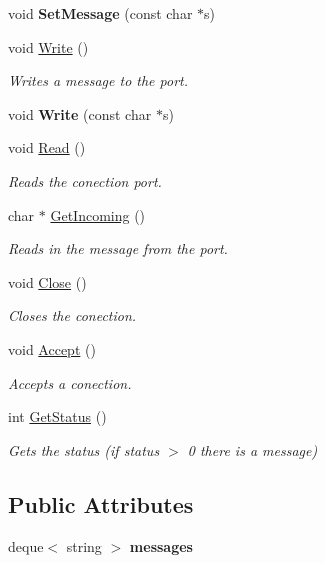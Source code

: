 \begin{DoxyCompactItemize}
\mbox{\label{class_net_thread_a488569dcffdf1056209aa8c2cd87d499}} 
void {\bfseries Set\+Message} (const char $\ast$s)
\item 
void \hyperlink{class_net_thread_a214ab68ced0017705fee382f38bf9fb7}{Write} ()
\begin{DoxyCompactList}\small\item\em Writes a message to the port. \end{DoxyCompactList}\item 
\mbox{\label{class_net_thread_aa4522291d843403e24edf38f806b4f29}} 
void {\bfseries Write} (const char $\ast$s)
\item 
void \hyperlink{class_net_thread_af3ea97a668d6e42d4ab7b81e6d126414}{Read} ()
\begin{DoxyCompactList}\small\item\em Reads the conection port. \end{DoxyCompactList}\item 
char $\ast$ \hyperlink{class_net_thread_ac63f5ac2706f99c40b8f5ff340aa263a}{Get\+Incoming} ()
\begin{DoxyCompactList}\small\item\em Reads in the message from the port. \end{DoxyCompactList}\item 
void \hyperlink{class_net_thread_ad21658535369817214ae60a6b5fe01e9}{Close} ()
\begin{DoxyCompactList}\small\item\em Closes the conection. \end{DoxyCompactList}\item 
void \hyperlink{class_net_thread_ae43eb627a7b606c819ef19f148eb250f}{Accept} ()
\begin{DoxyCompactList}\small\item\em Accepts a conection. \end{DoxyCompactList}\item 
int \hyperlink{class_net_thread_adf5fda96b9b068e3525aca08e1466508}{Get\+Status} ()
\begin{DoxyCompactList}\small\item\em Gets the status (if status $>$ 0 there is a message) \end{DoxyCompactList}\end{DoxyCompactItemize}
\subsection*{Public Attributes}
\begin{DoxyCompactItemize}
\item 
\mbox{\label{class_net_thread_add8e88623bbd03bc850e5f942cad3306}} 
deque$<$ string $>$ {\bfseries messages}
\end{DoxyCompactItemize}
